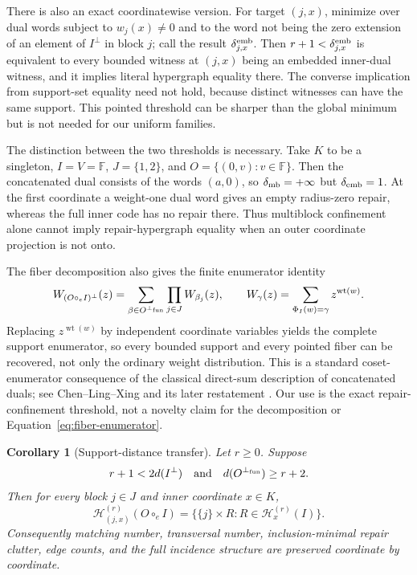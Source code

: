 \documentclass[11pt]{article}
\newtheorem{corollary}[theorem]{Corollary}
\theoremstyle{definition}
\theoremstyle{remark}
\newcommand{\F}{\mathbb{F}}
\newcommand{\cH}{\mathcal{H}}
\newcommand{\wt}{\operatorname{wt}}
\begin{document}
There is also an exact coordinatewise version.  For target $(j,x)$, minimize
over dual words subject to $w_j(x)\ne0$ and to the word not being the zero
extension of an element of $I^\perp$ in block $j$; call the result
$\delta^{\rm emb}_{j,x}$.  Then $r+1<\delta^{\rm emb}_{j,x}$ is equivalent
to every bounded witness at $(j,x)$ being an embedded inner-dual witness,
and it implies literal hypergraph equality there.  The converse implication
from support-set equality need not hold, because distinct witnesses can have
the same support.  This pointed threshold can be sharper than the global
minimum but is not needed for our uniform families.

The distinction between the two thresholds is necessary.  Take $K$ to be a
singleton, $I=V=\F$, $J=\{1,2\}$, and
$O=\{(0,v):v\in\F\}$.  Then the concatenated dual consists of the words
$(a,0)$, so $\delta_{\rm mb}=+\infty$ but $\delta_{\rm emb}=1$.  At the
first coordinate a weight-one dual word gives an empty radius-zero repair,
whereas the full inner code has no repair there.  Thus multiblock confinement
alone cannot imply repair-hypergraph equality when an outer coordinate
projection is not onto.

The fiber decomposition also gives the finite enumerator identity
\begin{equation}\label{eq:fiber-enumerator}
 W_{(O\circ_e I)^\perp}(z)
 =\sum_{\beta\in O^{\perp_{\rm fun}}}\prod_{j\in J}W_{\beta_j}(z),
 \qquad
 W_\gamma(z)=\sum_{\Phi_I(w)=\gamma}z^{\wt(w)}.
\end{equation}
Replacing $z^{\wt(w)}$ by independent coordinate variables yields the
complete support enumerator, so every bounded support and every pointed
fiber can be recovered, not only the ordinary weight distribution.  This is
a standard coset-enumerator consequence of the classical direct-sum
description of concatenated duals; see Chen--Ling--Xing
\cite[Theorem~2.3]{ChenLingXing2001} and its later restatement
\cite[Theorem~2.1]{ChenLingXing2005}.  Our use is the exact repair-confinement
threshold, not a novelty claim for the decomposition or
Equation~\eqref{eq:fiber-enumerator}.

\begin{corollary}[Support-distance transfer]\label{thm:transfer}
Let $r\geq0$.  Suppose
\[
 r+1<2d(I^\perp)
 \quad\text{and}\quad
 d(O^{\perp_{\rm fun}})\geq r+2.
\]
Then for every block $j\in J$ and inner coordinate $x\in K$,
\[
 \cH_{(j,x)}^{(r)}(O\circ_e I)
 =\{\{j\}\times R:R\in\cH_x^{(r)}(I)\}.
\]
Consequently matching number, transversal number, inclusion-minimal repair
clutter, edge counts, and the full incidence structure are preserved
coordinate by coordinate.
\end{corollary}
\end{document}
